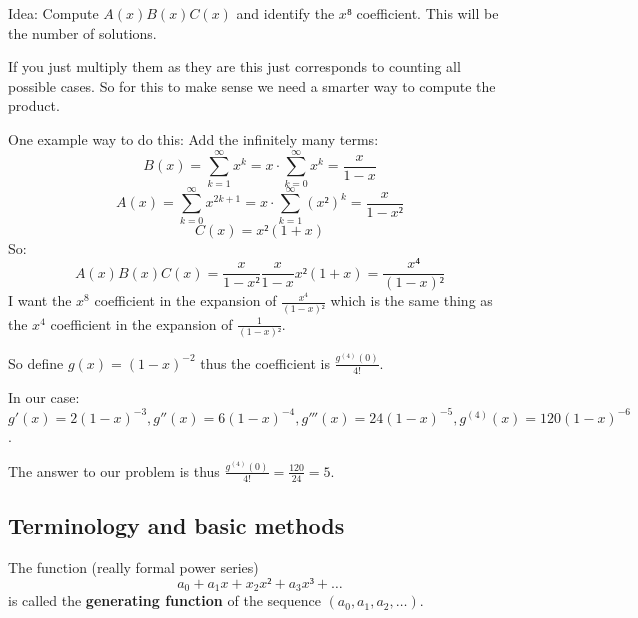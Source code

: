 \documentclass[english]{lbscript}
\begin{document}
Idea: Compute \(A(x)B(x)C(x)\) and identify the \(x⁸\) coefficient. This will be the number of solutions.

If you just multiply them as they are this just corresponds to counting all possible cases. So for this to make sense we need a smarter way to compute the product.

One example way to do this: Add the infinitely many terms:
\begin{equation}
  \label{eq:19}
  B(x) = ∑_{k=1}^{∞}x^{k} = x⋅∑_{k=0}^{∞}x^{k}= \frac{x}{1-x}
\end{equation}
\begin{equation}
  \label{eq:20}
  A(x) = ∑_{k=0}^{∞} x^{2k+1} = x⋅ ∑_{k=1}^{∞} (x²)^{k} = \frac{x}{1-x²}
\end{equation}
\begin{equation}
  \label{eq:21}
  C(x) = x²(1+x)
\end{equation}
So:
\begin{equation}
  \label{eq:22}
  A(x)B(x)C(x) = \frac{x}{1-x²} \frac{x}{1-x} x² (1+x) = \frac{x⁴}{(1-x)²}
\end{equation}
I want the \(x^{8}\) coefficient in the expansion of \(\frac{x^{4}}{(1-x)²}\) which is the same thing as the \(x^{4}\) coefficient in the expansion of \(\frac{1}{(1-x)²}\).

So define \(g(x) = (1-x)^{-2}\) thus the coefficient is \(\frac{g^{(4)}(0)}{4!}\).

In our case: \(g'(x)=2(1-x)^{-3}, g''(x)=6(1-x)^{-4}, g'''(x)=24(1-x)^{-5}, g^{(4)}(x) = 120(1-x)^{-6}\).

The answer to our problem is thus \(\frac{g^{(4)}(0)}{4!}= \frac{120}{24}=5\).


\subsection{Terminology and basic methods}
\label{sec:terminology}

\begin{definition}{}{}
  The function (really formal power series)
  \begin{equation}
    \label{eq:23}
    a_0 + a_1x + x_2x² + a_3x³ +\dots
  \end{equation}
  is called the \textbf{generating function} of the sequence \((a_0, a_1, a_2, \dots)\).
\end{definition}
\end{document}
